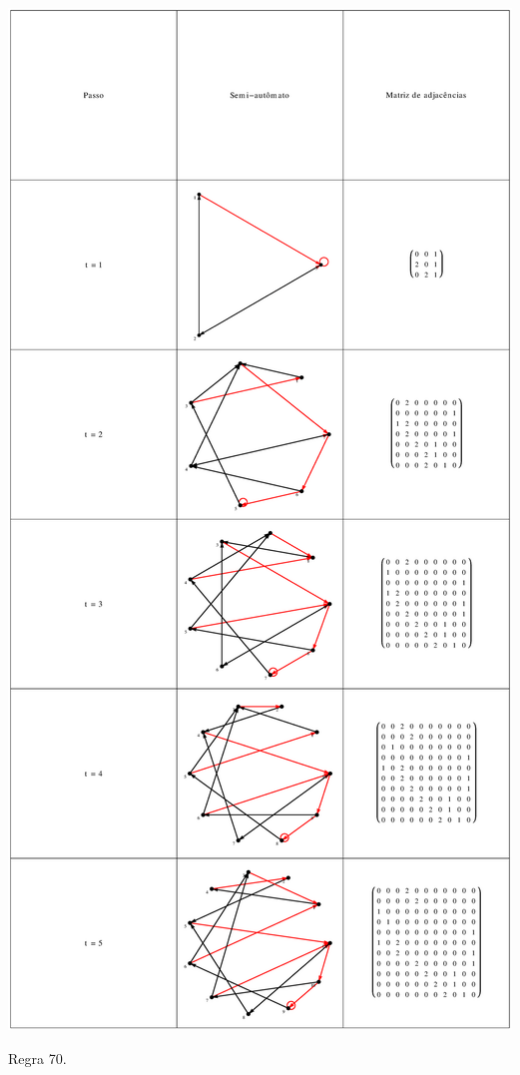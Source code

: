\documentclass[12pt,a4paper]{article}
\begin{document}
\begin{table}[H]
\begin{center}
\includegraphics[scale=0.32]{img/mat/matr70.eps}
\caption{Regra 70.}
\label{tab:mr70}
\end{center}
\end{table}
\end{document}

